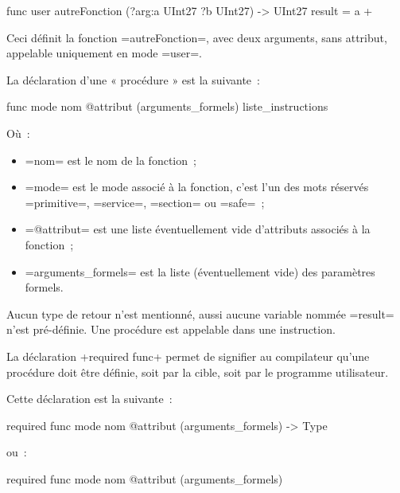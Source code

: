 \begin{OMNIBUS}
func user autreFonction (?arg:a UInt27 ?b UInt27) -> UInt27 {
  result = a +%
}
\end{OMNIBUS}

Ceci définit la fonction \omnibus=autreFonction=, avec deux arguments, sans attribut, appelable uniquement en mode \omnibus=user=.





La déclaration d'une « procédure » est la suivante~:
\begin{OMNIBUS}
func mode nom @attribut (arguments_formels) {
  liste_instructions
}
\end{OMNIBUS}
Où~:
\begin{itemize}
  \item \omnibus=nom= est le nom de la fonction~;
  \item \omnibus=mode= est le mode associé à la fonction, c'est l'un des mots réservés \omnibus=primitive=, \omnibus=service=, \omnibus=section= ou \omnibus=safe=~;
  \item \omnibus=@attribut= est une liste éventuellement vide d'attributs associés à la fonction~;
  \item \omnibus=arguments_formels= est la liste (éventuellement vide) des paramètres formels.
\end{itemize}

Aucun type de retour n'est mentionné, aussi aucune variable nommée \omnibus=result= n'est pré-définie. Une procédure est appelable dans une instruction.











La déclaration \omnibus+required func+ permet de signifier au compilateur qu'une procédure doit être définie, soit par la cible, soit par le programme utilisateur.

Cette déclaration est la suivante~:
\begin{OMNIBUS}
required func mode nom @attribut (arguments_formels) -> Type
\end{OMNIBUS}

ou~:

\begin{OMNIBUS}
required func mode nom @attribut (arguments_formels)
\end{OMNIBUS}

